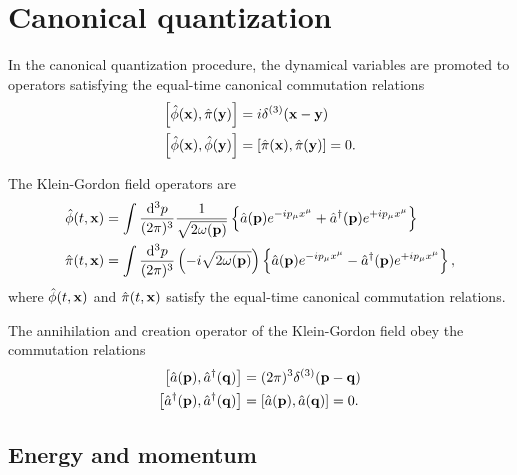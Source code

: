 \section{Canonical quantization}

\begin{definition}
	In the canonical quantization procedure, the dynamical variables are promoted to operators satisfying the equal-time canonical commutation relations
	\begin{align}
		\comm{\hat\phi(\vb{x})}{\hat\pi(\vb{y})}
		&=
		i\delta^{(3)}(\vb{x}-\vb{y})
		\\
		\comm{\hat\phi(\vb{x})}{\hat\phi(\vb{y})}
		&=
		\comm{\hat\pi(\vb{x})}{\hat\pi(\vb{y})}
		=
		0
		\label{eq:qkg_comm_pm}
		.
	\end{align}
\end{definition}
\begin{theorem}
	The Klein-Gordon field operators are
	\begin{align}
		\hat\phi(t,\vb{x})
		&=
		\int\frac{\dd[3]{p}}{(2\pi)^3}
		\frac{1}{\sqrt{2\omega(\vb{p})}}
		\left\{
			\hat{a}(\vb{p})
			e^{-ip_\mu x^\mu}
			+
			\hat{a}^\dagger(\vb{p})
			e^{+ip_\mu x^\mu}
		\right\}
		\label{eq:qkg_pos}
		\\
		\hat\pi(t,\vb{x})
		&=
		\int\frac{\dd[3]{p}}{(2\pi)^3}
		\left(-i\sqrt{2\omega(\vb{p})}\right)
		\left\{
			\hat{a}(\vb{p})
			e^{-ip_\mu x^\mu}
			-
			\hat{a}^\dagger(\vb{p})
			e^{+ip_\mu x^\mu}
		\right\}
		\label{eq:qkg_mom}
		,
	\end{align}
	where $\hat\phi(t,\vb{x})$ and $\hat\pi(t,\vb{x})$ satisfy the equal-time canonical commutation relations.
\end{theorem}
\begin{theorem}\label{thm:kg_comm_ac}
	The annihilation and creation operator of the Klein-Gordon field obey the commutation relations
	\begin{align}
		\comm{\hat{a}(\vb{p})}{\hat{a}^\dagger(\vb{q})}
		&=
		(2\pi)^3
		\delta^{(3)}(\vb{p}-\vb{q})
		\\
		\comm{\hat{a}^\dagger(\vb{p})}{\hat{a}^\dagger(\vb{q})}
		&=
		\comm{\hat{a}(\vb{p})}{\hat{a}(\vb{q})}
		=
		0
		\label{eq:kg_comm_ac}
		.
	\end{align}	
\end{theorem}

\subsection{Energy and momentum}

